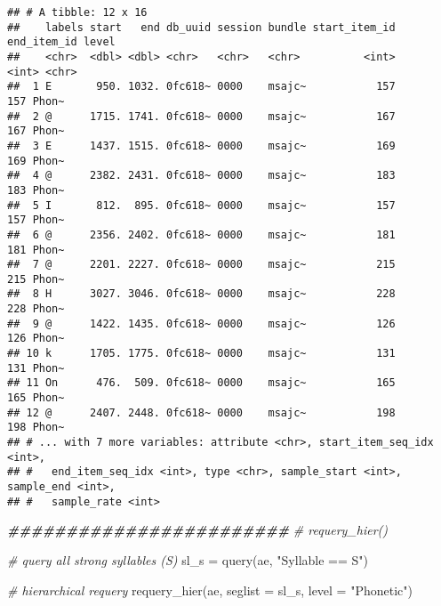 \documentclass[
]{book}
\newenvironment{Shaded}{\begin{snugshade}}{\end{snugshade}}
\newcommand{\AttributeTok}[1]{\textcolor[rgb]{0.77,0.63,0.00}{#1}}
\newcommand{\CommentTok}[1]{\textcolor[rgb]{0.56,0.35,0.01}{\textit{#1}}}
\newcommand{\DocumentationTok}[1]{\textcolor[rgb]{0.56,0.35,0.01}{\textbf{\textit{#1}}}}
\newcommand{\FunctionTok}[1]{\textcolor[rgb]{0.00,0.00,0.00}{#1}}
\newcommand{\NormalTok}[1]{#1}
\newcommand{\OtherTok}[1]{\textcolor[rgb]{0.56,0.35,0.01}{#1}}
\newcommand{\StringTok}[1]{\textcolor[rgb]{0.31,0.60,0.02}{#1}}
\begin{document}
\begin{verbatim}
## # A tibble: 12 x 16
##    labels start   end db_uuid session bundle start_item_id end_item_id level
##    <chr>  <dbl> <dbl> <chr>   <chr>   <chr>          <int>       <int> <chr>
##  1 E       950. 1032. 0fc618~ 0000    msajc~           157         157 Phon~
##  2 @      1715. 1741. 0fc618~ 0000    msajc~           167         167 Phon~
##  3 E      1437. 1515. 0fc618~ 0000    msajc~           169         169 Phon~
##  4 @      2382. 2431. 0fc618~ 0000    msajc~           183         183 Phon~
##  5 I       812.  895. 0fc618~ 0000    msajc~           157         157 Phon~
##  6 @      2356. 2402. 0fc618~ 0000    msajc~           181         181 Phon~
##  7 @      2201. 2227. 0fc618~ 0000    msajc~           215         215 Phon~
##  8 H      3027. 3046. 0fc618~ 0000    msajc~           228         228 Phon~
##  9 @      1422. 1435. 0fc618~ 0000    msajc~           126         126 Phon~
## 10 k      1705. 1775. 0fc618~ 0000    msajc~           131         131 Phon~
## 11 On      476.  509. 0fc618~ 0000    msajc~           165         165 Phon~
## 12 @      2407. 2448. 0fc618~ 0000    msajc~           198         198 Phon~
## # ... with 7 more variables: attribute <chr>, start_item_seq_idx <int>,
## #   end_item_seq_idx <int>, type <chr>, sample_start <int>, sample_end <int>,
## #   sample_rate <int>
\end{verbatim}

\begin{Shaded}
\begin{Highlighting}[]
\DocumentationTok{\#\#\#\#\#\#\#\#\#\#\#\#\#\#\#\#\#\#\#\#\#\#\#\#}
\CommentTok{\# requery\_hier()}

\CommentTok{\# query all strong syllables (S)}
\NormalTok{sl\_s }\OtherTok{=} \FunctionTok{query}\NormalTok{(ae, }\StringTok{"Syllable == S"}\NormalTok{)}

\CommentTok{\# hierarchical requery}
\FunctionTok{requery\_hier}\NormalTok{(ae, }
             \AttributeTok{seglist =}\NormalTok{ sl\_s,}
             \AttributeTok{level =} \StringTok{"Phonetic"}\NormalTok{)}
\end{Highlighting}
\end{Shaded}
\end{document}

